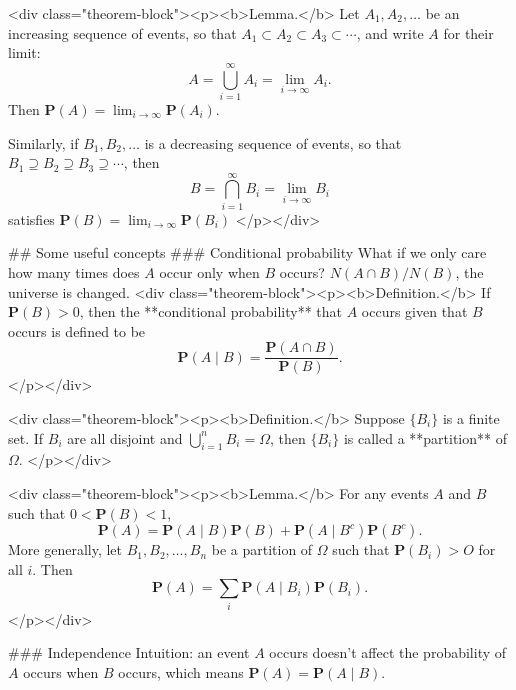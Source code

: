 <div class="theorem-block"><p><b>Lemma.</b> 
Let $A_1, A_2, \dots$ be an increasing sequence of events, so that $A_1 \subset A_2 \subset A_3 \subset \cdots$, and write $A$ for their limit:
$$\begin{equation}
    A = \bigcup_{i=1}^\infty A_i = \lim_{i \to \infty} A_i.
\end{equation}$$
Then $\mathbf{P}(A) = \lim_{i\to\infty} \mathbf{P}(A_i)$. 

Similarly, if $B_1, B_2, \dots$ is a decreasing sequence of events, so that $B_1 \supseteq  B_2 \supseteq B_3 \supseteq \cdots$, then 
$$\begin{equation}
    B = \bigcap_{i=1}^\infty B_i = \lim_{i \to \infty} B_i
\end{equation}$$
satisfies $\mathbf{P}(B) = \lim_{i\to\infty} \mathbf{P}(B_i)$
</p></div>


## Some useful concepts
### Conditional probability
What if we only care how many times does $A$ occur only when $B$ occurs? $N(A\cap B) / N(B)$, the universe is changed. 
<div class="theorem-block"><p><b>Definition.</b> 
If $\mathbf{P}(B) > 0$, then the **conditional probability** that $A$ occurs given that $B$ occurs is defined to be
$$\begin{equation}
    \mathbf{P}(A \;\vert\; B) = \frac{\mathbf{P}(A \cap B)}{\mathbf{P}(B)}.
\end{equation}$$
</p></div>

<div class="theorem-block"><p><b>Definition.</b> 
Suppose $\{B_i\}$ is a finite set. If $B_i$ are all disjoint and $\bigcup_{i=1}^n B_i = \Omega$, then $\{B_i\}$ is called a **partition** of $\Omega$.
</p></div>

<div class="theorem-block"><p><b>Lemma.</b> 
For any events $A$ and $B$ such that $0 < \mathbf{P}(B) < 1$,
$$\begin{equation}
    \mathbf{P}(A) = \mathbf{P}(A \;\vert\; B) \mathbf{P}(B) + \mathbf{P}(A \;\vert\; B^c) \mathbf{P}(B^c).
\end{equation}$$
More generally, let $B_1,  B_2, \dots, B_n$ be a partition of $\Omega$ such that $\mathbf{P}(B_i) > O$ for all $i$. Then 
$$\begin{equation}
    \mathbf{P}(A) = \sum_i \mathbf{P}(A \;\vert\; B_i) \mathbf{P}(B_i).
\end{equation}$$
</p></div>

### Independence
Intuition: an event $A$ occurs doesn't affect the probability of $A$ occurs when $B$ occurs, which means $\mathbf{P}(A) = \mathbf{P}(A\;\vert\; B)$.


